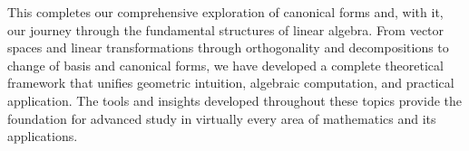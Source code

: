 \documentclass[12pt]{article}
\numberwithin{equation}{section}
\theoremstyle{plain}
\theoremstyle{definition}
\theoremstyle{remark}
\begin{document}
This completes our comprehensive exploration of canonical forms and, with it, our journey through the fundamental structures of linear algebra. From vector spaces and linear transformations through orthogonality and decompositions to change of basis and canonical forms, we have developed a complete theoretical framework that unifies geometric intuition, algebraic computation, and practical application. The tools and insights developed throughout these topics provide the foundation for advanced study in virtually every area of mathematics and its applications.

\end{document}
